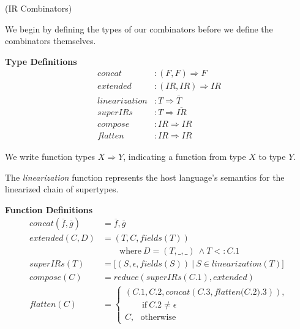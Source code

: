\documentclass[preprint,10pt]{sigplanconf}
\theoremstyle{definition}
\theoremstyle{definition}
\begin{document}
\vspace{0.3cm}

\begin{defn}{(IR Combinators)}

We begin by defining the types of our combinators before we define the
combinators themselves.

\vspace{0.2cm}
{\bf Type Definitions}
{\small
\begin{align*}
\textit{concat}&        : (F, F) \Rightarrow F\\
\textit{extended}&      : (IR, IR) \Rightarrow IR\\
\textit{linearization}& : T \Rightarrow \overline{T}\\
\textit{superIRs}&      : T \Rightarrow \overline{IR}\\
\textit{compose}&       : IR \Rightarrow IR\\
\textit{flatten}&       : IR \Rightarrow IR
\end{align*}
}%

We write function types $X \Rightarrow Y$, indicating a function from type $X$
to type $Y$.

The \textit{linearization} function represents the host language's semantics for the
linearized chain of supertypes.\footnotemark[1]

\vspace{0.3cm}

{\bf Function Definitions}
{\small
\begin{align*}
\textit{concat}(\overline{f}, \overline{g})& = \overline{f}, \overline{g}\\
\textit{extended}(C, D)&                     = (T, C, \textit{fields}(T))\\
                       &                       \qquad \mbox{where}~D = (T, \_, \_)~\land T <: C.1\\
\textit{superIRs}(T)&                        = \lbrack(S, \epsilon, \textit{fields}(S))~|~S\in \textit{linearization}(T)\rbrack\\
\textit{compose}(C)&                         = \textit{reduce}(\textit{superIRs}(C.1),\textit{extended})\\
\textit{flatten}(C)&                         =\left\{ \begin{array}{l}
                                                (C.1, C.2, \textit{concat}(C.3, \textit{flatten(C.2).3})),\\
                                                \qquad\mbox{if}~C.2\neq\epsilon\\
                                                C,~~~\mbox{otherwise}
                                              \end{array} \right.
\end{align*}
}%



\end{defn}
\end{document}

